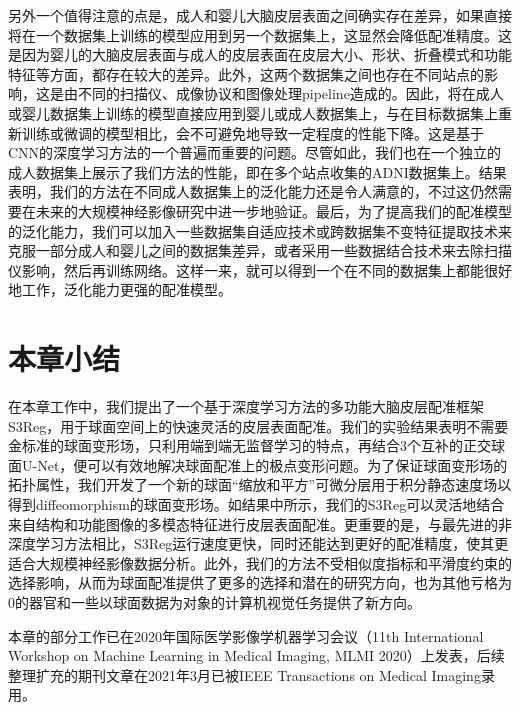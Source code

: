另外一个值得注意的点是，成人和婴儿大脑皮层表面之间确实存在差异，如果直接将在一个数据集上训练的模型应用到另一个数据集上，这显然会降低配准精度。这是因为婴儿的大脑皮层表面与成人的皮层表面在皮层大小、形状、折叠模式和功能特征等方面，都存在较大的差异\cite{li2015construction}。此外，这两个数据集之间也存在不同站点的影响，这是由不同的扫描仪、成像协议和图像处理pipeline造成的。因此，将在成人或婴儿数据集上训练的模型直接应用到婴儿或成人数据集上，与在目标数据集上重新训练或微调的模型相比，会不可避免地导致一定程度的性能下降。这是基于CNN的深度学习方法的一个普遍而重要的问题\cite{shen2017deep}。尽管如此，我们也在一个独立的成人数据集上展示了我们方法的性能，即在多个站点收集的ADNI数据集上。结果表明，我们的方法在不同成人数据集上的泛化能力还是令人满意的，不过这仍然需要在未来的大规模神经影像研究中进一步地验证。最后，为了提高我们的配准模型的泛化能力，我们可以加入一些数据集自适应技术\cite{he2020self}或跨数据集不变特征提取技术\cite{zhong2020dika}来克服一部分成人和婴儿之间的数据集差异，或者采用一些数据结合技术\cite{zhao2019harmonization}来去除扫描仪影响，然后再训练网络。这样一来，就可以得到一个在不同的数据集上都能很好地工作，泛化能力更强的配准模型。

\section{本章小结}
在本章工作中，我们提出了一个基于深度学习方法的多功能大脑皮层配准框架S3Reg，用于球面空间上的快速灵活的皮层表面配准。我们的实验结果表明不需要金标准的球面变形场，只利用端到端无监督学习的特点，再结合3个互补的正交球面U-Net，便可以有效地解决球面配准上的极点变形问题。为了保证球面变形场的拓扑属性，我们开发了一个新的球面“缩放和平方”可微分层用于积分静态速度场以得到diffeomorphism的球面变形场。如结果中所示，我们的S3Reg可以灵活地结合来自结构和功能图像的多模态特征进行皮层表面配准。更重要的是，与最先进的非深度学习方法相比，S3Reg运行速度更快，同时还能达到更好的配准精度，使其更适合大规模神经影像数据分析。此外，我们的方法不受相似度指标和平滑度约束的选择影响，从而为球面配准提供了更多的选择和潜在的研究方向，也为其他亏格为0的器官和一些以球面数据为对象的计算机视觉任务提供了新方向。

本章的部分工作已在2020年国际医学影像学机器学习会议（11th International Workshop on Machine Learning in Medical Imaging, MLMI 2020）上发表，后续整理扩充的期刊文章在2021年3月已被IEEE Transactions on Medical Imaging录用。










